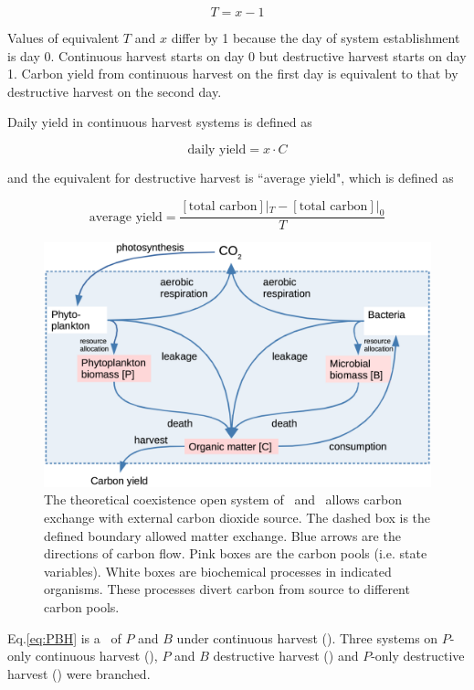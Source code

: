 \documentclass[env.tex]{subfiles}
\begin{document}
\begin{equation*}
    T = x-1
    \label{eq:TvsX}
\end{equation*}

Values of equivalent $T$ and $x$ differ by 1 because the day of system establishment is day 0.  Continuous harvest starts on day 0 but destructive harvest starts on day 1.  Carbon yield from continuous harvest on the first day is equivalent to that by destructive harvest on the second day.

Daily yield in continuous harvest systems is defined as

\begin{equation}
    \text{daily yield} = x\cdot C
    \label{eq:yield}
\end{equation}

and the equivalent for destructive harvest is ``average yield", which is defined as

\begin{equation*}
    \text{average yield} = \dfrac{[\text{total carbon}]|_{T}-[\text{total carbon}]|_{0}}{T}
    \label{eq:avgYd}
\end{equation*}

\begin{figure}[H]
    \centering
    \includegraphics[width=.8\linewidth]{sec/model.png}
    \caption[Model visualization]{The theoretical coexistence open system of \phy\ and \bac\ allows carbon exchange with external carbon dioxide source.  The dashed box is the defined boundary allowed matter exchange.  Blue arrows are the directions of carbon flow.  Pink boxes are the carbon pools (i.e. state variables).  White boxes are biochemical processes in indicated organisms.  These processes divert carbon from source to different carbon pools.}
    \label{f:model}
\end{figure}

Eq.\ref{eq:PBH} is a \pbs\ of $P$ and $B$ under continuous harvest (\PBH).  Three systems on $P$-only continuous harvest (\PoH), $P$ and $B$ destructive harvest (\PBN) and $P$-only destructive harvest (\PoN) were branched.
\end{document}
